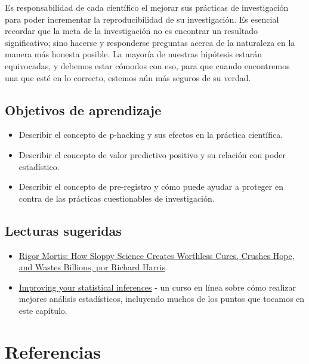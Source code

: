 \documentclass[
  12pt,
]{book}
\providecommand{\tightlist}{%
  \setlength{\itemsep}{0pt}\setlength{\parskip}{0pt}}
\begin{document}
Es responsabilidad de cada científico el mejorar sus prácticas de investigación para poder incrementar la reproducibilidad de su investigación. Es esencial recordar que la meta de la investigación no es encontrar un resultado significativo; sino hacerse y responderse preguntas acerca de la naturaleza en la manera más honesta posible. La mayoría de nuestras hipótesis estarán equivocadas, y debemos estar cómodos con eso, para que cuando encontremos una que esté en lo correcto, estemos aún más seguros de su verdad.

\hypertarget{objetivos-de-aprendizaje-15}{%
\section{Objetivos de aprendizaje}\label{objetivos-de-aprendizaje-15}}

\begin{itemize}
\tightlist
\item
  Describir el concepto de p-hacking y sus efectos en la práctica científica.
\item
  Describir el concepto de valor predictivo positivo y su relación con poder estadístico.
\item
  Describir el concepto de pre-registro y cómo puede ayudar a proteger en contra de las prácticas cuestionables de investigación.
\end{itemize}

\hypertarget{lecturas-sugeridas-11}{%
\section{Lecturas sugeridas}\label{lecturas-sugeridas-11}}

\begin{itemize}
\tightlist
\item
  \href{https://www.amazon.com/dp/B01K3WN72C}{Rigor Mortis: How Sloppy Science Creates Worthless Cures, Crushes Hope, and Wastes Billions, por Richard Harris}
\item
  \href{https://www.coursera.org/learn/statistical-inferences}{Improving your statistical inferences} - un curso en línea sobre cómo realizar mejores análisis estadísticos, incluyendo muchos de los puntos que tocamos en este capítulo.
\end{itemize}

\newpage

\hypertarget{referencias}{%
\chapter{Referencias}\label{referencias}}
\end{document}
